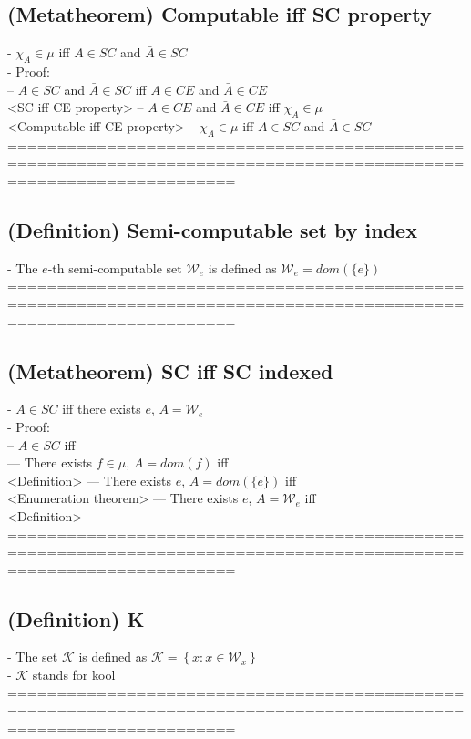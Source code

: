 \documentclass{book}
\newcommand{\set}[1]{\left\{ #1 \right\}}
\begin{document}
\subsection{(Metatheorem) Computable iff SC property} %
	- $\chi_A \in \mu$ iff $A \in SC$ and $\bar{A} \in SC$ \\
	- Proof: \\
		-- $A \in SC$ and $\bar{A} \in SC$ iff $A \in CE$ and $\bar{A} \in CE$ \\ <SC iff CE property>
		-- $A \in CE$ and $\bar{A} \in CE$ iff $\chi_A \in \mu$ \\ <Computable iff CE property>
		-- $\chi_A \in \mu$ iff $A \in SC$ and $\bar{A} \in SC$ \\
	===================================================================================================================
\subsection{(Definition) Semi-computable set by index} %
	- The $e$-th semi-computable set $\mathcal{W}_e$ is defined as $\mathcal{W}_e = dom(\{e\})$ \\
	===================================================================================================================
\subsection{(Metatheorem) SC iff SC indexed} %
	- $A \in SC$ iff there exists $e$, $A = \mathcal{W}_e$ \\
	- Proof: \\
		-- $A \in SC$ iff \\
			--- There exists $f \in \mu$, $A = dom(f)$ iff \\ <Definition>
			--- There exists $e$, $A = dom(\{e\})$ iff \\ <Enumeration theorem>
			--- There exists $e$, $A = \mathcal{W}_e$ iff \\ <Definition>
	===================================================================================================================
\subsection{(Definition) K} %
	- The set $\mathcal{K}$ is defined as $\mathcal{K} = \set{x: x \in \mathcal{W}_x}$ \\
	- $\mathcal{K}$ stands for kool \\
	===================================================================================================================
\end{document}
